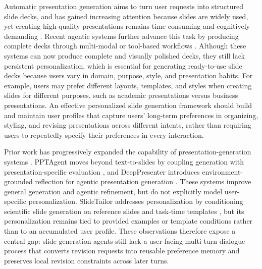 \documentclass{llmxive}
\begin{document}
Automatic presentation generation aims to turn 
user requests into structured slide decks, and 
has gained increasing attention because slides are widely used, yet creating high-quality presentations remains time-consuming and cognitively demanding
\citep{sun2021d2s,maheshwari2024presentations,mondal2024personaaware,zeng2025slidetailor}.
Recent agentic systems further advance this task by 
producing 
complete decks through multi-modal or tool-based workflows
\citep{ge2025autopresent,zheng2025pptagent,xu2025pregenie,xie2025slidebot,liang2025slidegen,zheng2026deeppresenter,ozden2026arcdeck}.
Although these systems can now produce complete and visually polished decks,
they still lack persistent personalization, which is essential for generating ready-to-use slide decks because users vary in domain, purpose, style, and presentation habits.
For example, users may prefer different layouts, templates, and styles when creating slides for different purposes, such as academic presentations versus business presentations.
An effective personalized slide generation framework should build and maintain user profiles that capture users' long-term preferences in organizing, styling, and revising presentations across different intents, rather than requiring users to repeatedly specify their preferences in every interaction.





Prior work has progressively expanded the capability of presentation-generation
systems \citep{sun2021d2s,mondal2024personaaware,
bandyopadhyay2024enhancing,maheshwari2024presentations,ge2025autopresent,
xu2025pregenie,xie2025slidebot,liang2025slidegen,ozden2026arcdeck}. 
PPTAgent moves beyond text-to-slides by coupling generation with
presentation-specific evaluation \citep{zheng2025pptagent}, and DeepPresenter
introduces environment-grounded reflection for agentic presentation generation
\citep{zheng2026deeppresenter}. These systems improve general generation and
agentic refinement, but do not explicitly model user-specific personalization.
SlideTailor addresses personalization by conditioning scientific
slide generation on reference slides and task-time templates
\citep{zeng2025slidetailor}, but its personalization remains tied to provided
examples or template conditions rather than to an accumulated user profile.
These observations therefore expose a central gap: slide generation agents still lack a user-facing multi-turn dialogue process that converts revision requests into reusable preference memory and preserves local revision constraints across later turns.
\end{document}
